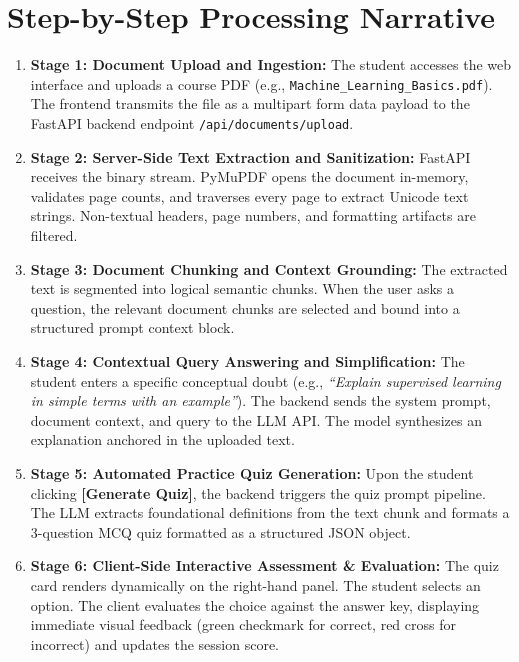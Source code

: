 \documentclass[11pt,a4paper]{report}
\begin{document}
\section{Step-by-Step Processing Narrative}
\begin{enumerate}[topsep=2pt, itemsep=6pt]
    \item \textbf{Stage 1: Document Upload and Ingestion:}
    The student accesses the web interface and uploads a course PDF (e.g., \texttt{Machine\_Learning\_Basics.pdf}). The frontend transmits the file as a multipart form data payload to the FastAPI backend endpoint \texttt{/api/documents/upload}.
    
    \item \textbf{Stage 2: Server-Side Text Extraction and Sanitization:}
    FastAPI receives the binary stream. PyMuPDF opens the document in-memory, validates page counts, and traverses every page to extract Unicode text strings. Non-textual headers, page numbers, and formatting artifacts are filtered.
    
    \item \textbf{Stage 3: Document Chunking and Context Grounding:}
    The extracted text is segmented into logical semantic chunks. When the user asks a question, the relevant document chunks are selected and bound into a structured prompt context block.
    
    \item \textbf{Stage 4: Contextual Query Answering and Simplification:}
    The student enters a specific conceptual doubt (e.g., \textit{``Explain supervised learning in simple terms with an example''}). The backend sends the system prompt, document context, and query to the LLM API. The model synthesizes an explanation anchored in the uploaded text.
    
    \item \textbf{Stage 5: Automated Practice Quiz Generation:}
    Upon the student clicking \textbf{[Generate Quiz]}, the backend triggers the quiz prompt pipeline. The LLM extracts foundational definitions from the text chunk and formats a 3-question MCQ quiz formatted as a structured JSON object.
    
    \item \textbf{Stage 6: Client-Side Interactive Assessment \& Evaluation:}
    The quiz card renders dynamically on the right-hand panel. The student selects an option. The client evaluates the choice against the answer key, displaying immediate visual feedback (green checkmark for correct, red cross for incorrect) and updates the session score.
\end{enumerate}
\clearpage
\end{document}
